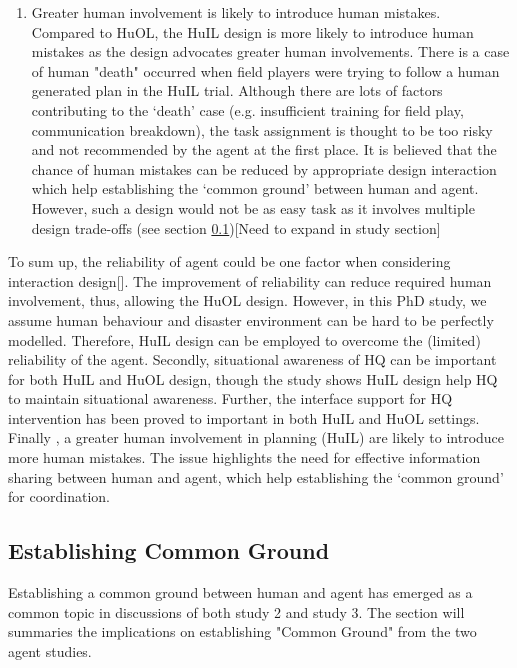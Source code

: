 \begin{enumerate}
\item Greater human involvement is likely to introduce human mistakes. \\
Compared to HuOL, the HuIL design is more likely to introduce human mistakes as the design advocates greater human involvements. There is a case of  human "death" occurred  when field players were trying to follow a human generated plan in the HuIL trial.  Although there are lots of factors contributing to the `death' case (e.g. insufficient training for field play, communication breakdown), the task assignment is thought to be too risky and not recommended by the agent at the first place. It is believed that the chance of human mistakes can be reduced by appropriate design interaction which help establishing the `common ground' between human and agent. However, such a design would not be as easy task as it involves multiple design trade-offs  (see section \ref{sec:conclusionCG})[Need to expand in study section]

\end{enumerate}

To sum up, the reliability of agent could be one factor when considering interaction design[]. The improvement of reliability can reduce required human involvement, thus, allowing the HuOL design. However, in this PhD study, we assume human behaviour and disaster environment can be hard to be perfectly modelled. Therefore, HuIL design can be employed to overcome the (limited) reliability of the agent. Secondly, situational awareness of HQ can be important for both HuIL and HuOL design, though the study shows HuIL design help HQ to maintain situational awareness. Further, the interface support for HQ intervention has been proved to important in both HuIL and HuOL settings. Finally , a greater human involvement in planning (HuIL) are likely to introduce more human mistakes. The issue highlights the need for effective information sharing between human and agent, which help establishing the `common ground' for coordination. \\


\subsection{Establishing Common Ground} \label{sec:conclusionCG}
Establishing a common ground between human and agent has emerged as a common topic in discussions of both study 2 and study 3. The section will summaries the implications on establishing "Common Ground" from the two agent studies. \\


